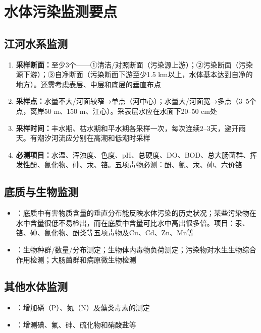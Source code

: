 \section{水体污染监测要点}

\subsection{江河水系监测}
\begin{enumerate}[leftmargin=*]
    \item \textbf{采样断面：}至少3个——①清洁/对照断面（污染源上游）；②污染断面（污染源下游）；③自净断面（污染断面下游至少1.5 km以上，水体基本达到自净的地方）。还需考虑表层、中层和底层的垂直布点
    \item \textbf{采样点：}水量不大/河面较窄→单点（河中心）；水量大/河面宽→多点（3--5个点，离岸50 m、150 m、江心）。采表层水应在水面下20--50 cm处
    \item \textbf{采样时间：}丰水期、枯水期和平水期各采样一次，每次连续2--3天，避开雨天。有潮汐河流应分别在高潮和低潮时采样
    \item \textbf{必测项目：}水温、浑浊度、色度、pH、总硬度、DO、BOD、总大肠菌群、挥发性酚、氰化物、砷、汞、铬。五项毒物必测：酚、氰、汞、砷、六价铬
\end{enumerate}

\subsection{底质与生物监测}
\begin{itemize}[leftmargin=*]
    \item {}：底质中有害物质含量的垂直分布能反映水体污染的历史状况；某些污染物在水中含量很低不易检出，而在底质中含量可比水中高出很多倍。项目：汞、铬、砷、氰化物、酚类等五项毒物及Cu、Cd、Zn、Mn等
    \item {}：生物种群/数量/分布测定；生物体内毒物负荷测定；污染物对水生生物综合作用检测；大肠菌群和病原微生物检测
\end{itemize}

\subsection{其他水体监测}
\begin{itemize}[leftmargin=*]
    \item {}：增加磷（P）、氮（N）及藻类毒素的测定
    \item {}：增测碘、氟、砷、硫化物和硝酸盐等
\end{itemize}

